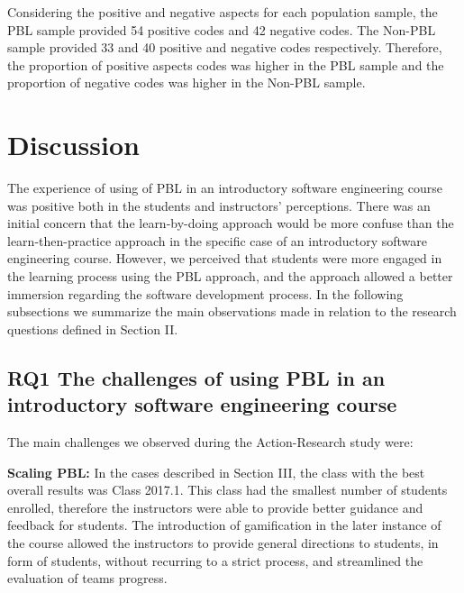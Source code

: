 Considering the positive and negative aspects for each population sample, the PBL sample provided 54 positive codes and 42 negative codes. The Non-PBL sample provided 33 and 40 positive and negative codes respectively. Therefore, the proportion of positive aspects codes was higher in the PBL sample and the proportion of negative codes was higher in the Non-PBL sample.

\section{Discussion}

The experience of using of PBL in an introductory software engineering course was positive both in the students and instructors’ perceptions. There was an initial concern that the learn-by-doing approach would be more confuse than the learn-then-practice approach in the specific case of an introductory software engineering course. However, we perceived that students were more engaged in the learning process using the PBL approach, and the approach allowed a better immersion regarding the software development process. In the following subsections we summarize the main observations made in relation to the research questions defined in Section II.

\subsection{RQ1 The challenges of using PBL in an introductory software engineering course}

The main challenges we observed during the Action-Research study were:

\textbf{Scaling PBL:} In the cases described in Section III, the class with the best overall results was Class 2017.1. This class had the smallest number of students enrolled, therefore the instructors were able to provide better guidance and feedback for students. The introduction of gamification in the later instance of the course allowed the instructors to provide general directions to students, in form of students, without recurring to a strict process, and streamlined the evaluation of teams progress.

